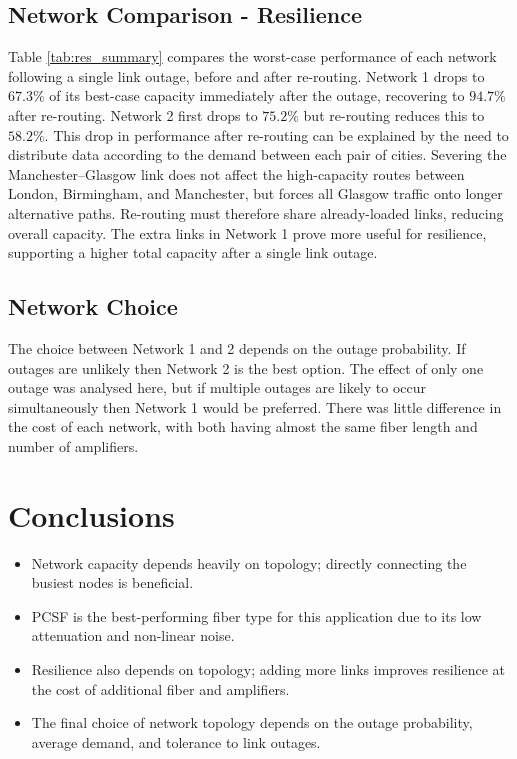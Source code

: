 \documentclass[12pt,a4paper]{article}
\begin{document}
\subsection{Network Comparison - Resilience}
Table \ref{tab:res_summary} compares the worst-case performance of each network following a single link outage, before and after re-routing. Network 1 drops to \(67.3\%\) of its best-case capacity immediately after the outage, recovering to \(94.7\%\) after re-routing. Network 2 first drops to \(75.2\%\) but re-routing reduces this to \(58.2\%\). This drop in performance after re-routing can be explained by the need to distribute data according to the demand between each pair of cities. Severing the Manchester--Glasgow link does not affect the high-capacity routes between London, Birmingham, and Manchester, but forces all Glasgow traffic onto longer alternative paths. Re-routing must therefore share already-loaded links, reducing overall capacity. The extra links in Network 1 prove more useful for resilience, supporting a higher total capacity after a single link outage.

\subsection{Network Choice}
The choice between Network 1 and 2 depends on the outage probability. If outages are unlikely then Network 2 is the best option. The effect of only one outage was analysed here, but if multiple outages are likely to occur simultaneously then Network 1 would be preferred. There was little difference in the cost of each network, with both having almost the same fiber length and number of amplifiers.
\section{Conclusions}
\begin{itemize}
    \item Network capacity depends heavily on topology; directly connecting the busiest nodes is beneficial.
    \item PCSF is the best-performing fiber type for this application due to its low attenuation and non-linear noise.
    \item Resilience also depends on topology; adding more links improves resilience at the cost of additional fiber and amplifiers.
    \item The final choice of network topology depends on the outage probability, average demand, and tolerance to link outages.
\end{itemize}
\end{document}
